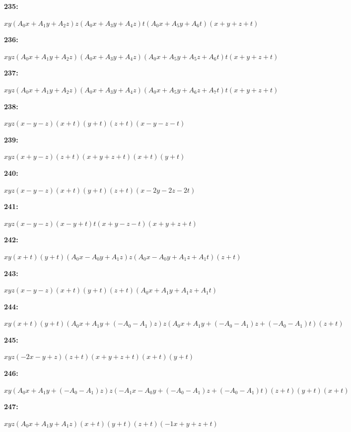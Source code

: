 \documentclass[12pt]{amsart}
\theoremstyle{plain}
\theoremstyle{remark}
\theoremstyle{definition}
\numberwithin{table}{section}
\begin{document}
\noindent\parbox[right]{9mm}{\textbf{235:}}\parbox{3mm}{\hfill}%
\parbox[t]{15cm}{\(xy(A_{0}x + A_{1}y + A_{2}z)z(A_{0}x + A_{3}y + A_{4}z)t(A_{0}x + A_{5}y + A_{6}t)(x + y + z + t)\)}

\noindent\parbox[right]{9mm}{\textbf{236:}}\parbox{3mm}{\hfill}%
\parbox[t]{15cm}{\(xyz(A_{0}x + A_{1}y + A_{2}z)(A_{0}x + A_{3}y + A_{4}z)(A_{0}x + A_{5}y + A_{5}z + A_{6}t)t(x + y + z + t)\)}

\noindent\parbox[right]{9mm}{\textbf{237:}}\parbox{3mm}{\hfill}%
\parbox[t]{15cm}{\(xyz(A_{0}x + A_{1}y + A_{2}z)(A_{0}x + A_{3}y + A_{4}z)(A_{0}x + A_{5}y + A_{6}z + A_{7}t)t(x + y + z + t)\)}

\noindent\parbox[right]{9mm}{\textbf{238:}}\parbox{3mm}{\hfill}%
\parbox[t]{15cm}{\(xyz(x - y - z)(x + t)(y + t)(z + t)(x - y - z - t)\)}

\noindent\parbox[right]{9mm}{\textbf{239:}}\parbox{3mm}{\hfill}%
\parbox[t]{15cm}{\(xyz(x + y - z)(z + t)(x + y + z + t)(x + t)(y + t)\)}

\noindent\parbox[right]{9mm}{\textbf{240:}}\parbox{3mm}{\hfill}%
\parbox[t]{15cm}{\(xyz(x - y - z)(x + t)(y + t)(z + t)(x - 2y - 2z - 2t)\)}

\noindent\parbox[right]{9mm}{\textbf{241:}}\parbox{3mm}{\hfill}%
\parbox[t]{15cm}{\(xyz(x - y - z)(x - y + t)t(x + y - z - t)(x + y + z + t)\)}

\noindent\parbox[right]{9mm}{\textbf{242:}}\parbox{3mm}{\hfill}%
\parbox[t]{15cm}{\(xy(x + t)(y + t)(A_{0}x - A_{0}y + A_{1}z)z(A_{0}x - A_{0}y + A_{1}z + A_{1}t)(z + t)\)}

\noindent\parbox[right]{9mm}{\textbf{243:}}\parbox{3mm}{\hfill}%
\parbox[t]{15cm}{\(xyz(x - y - z)(x + t)(y + t)(z + t)(A_{0}x + A_{1}y + A_{1}z + A_{1}t)\)}

\noindent\parbox[right]{9mm}{\textbf{244:}}\parbox{3mm}{\hfill}%
\parbox[t]{15cm}{\(xy(x + t)(y + t)(A_{0}x + A_{1}y + (-A_{0} - A_{1})z)z(A_{0}x + A_{1}y + (-A_{0} - A_{1})z + (-A_{0} - A_{1})t)(z + t)\)}

\noindent\parbox[right]{9mm}{\textbf{245:}}\parbox{3mm}{\hfill}%
\parbox[t]{15cm}{\(xyz(-2x - y + z)(z + t)(x + y + z + t)(x + t)(y + t)\)}

\noindent\parbox[right]{9mm}{\textbf{246:}}\parbox{3mm}{\hfill}%
\parbox[t]{15cm}{\(xy(A_{0}x + A_{1}y + (-A_{0} - A_{1})z)z(-A_{1}x - A_{0}y + (-A_{0} - A_{1})z + (-A_{0} - A_{1})t)(z + t)(y + t)(x + t)\)}

\noindent\parbox[right]{9mm}{\textbf{247:}}\parbox{3mm}{\hfill}%
\parbox[t]{15cm}{\(xyz(A_{0}x + A_{1}y + A_{1}z)(x + t)(y + t)(z + t)(-1x + y + z + t)\)}
\end{document}
